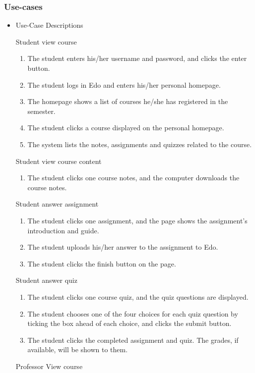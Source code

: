 \documentclass[paper=a4, fontsize=11pt]{scrartcl}
\numberwithin{equation}{section}		%
\numberwithin{figure}{section}			%
\numberwithin{table}{section}				%
\begin{document}
\subsubsection{Use-cases}
\begin{itemize}
	\item Use-Case Descriptions
	\par Student view course
	\begin{enumerate}
		\item The student enters his/her username and password, and clicks the enter button.
		\item The student logs in Edo and enters his/her personal homepage. 
		\item The homepage shows a list of courses he/she has registered in the semester.
		\item The student clicks a course displayed on the personal homepage.
		\item The system lists the notes, assignments and quizzes related to the course.
	\end{enumerate}
	\par Student view course content
	\begin{enumerate}
		\item The student clicks one course notes, and the computer downloads the course notes.
	\end{enumerate}
	\par Student answer assignment
	\begin{enumerate}
		\item The student clicks one assignment, and the page shows the assignment's introduction and guide.
		\item The student uploads his/her answer to the assignment to Edo.
		\item The student clicks the finish button on the page.
	\end{enumerate}
	\par Student answer quiz
	\begin{enumerate}
		\item The student clicks one course quiz, and the quiz questions are displayed.
		\item The student chooses one of the four choices for each quiz question by ticking the box ahead of each choice, and clicks the submit button.
		\item The student clicks the completed assignment and quiz. The grades, if available, will be shown to them. 
	\end{enumerate}
	\par Professor View course

\end{itemize}
\end{document}

